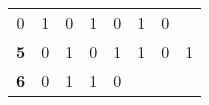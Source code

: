 \documentclass[11pt,english,landscape]{article}
\begin{document}
\begin{multicols}{3}
\begin{tabular}{| c | c | c | c | c | c | c | c |}
		\textcolor{MaterialIndigo}{0}          &                                                                                                
		\textcolor{MaterialPink}{1}            &                                                                                                
		\textcolor{MaterialIndigo}{0}          &                                                                                                
		\textcolor{MaterialPink}{1}            &                                                                                                
		\textcolor{MaterialIndigo}{0}          &                                                                                                
		\textcolor{MaterialPink}{1}            &                                                                                                
		\textcolor{MaterialIndigo}{0} 
		\\
		\rowcolor{GoogleYellow!20}\bfseries{5} &                                                                                                
		\textcolor{MaterialIndigo}{0}          &                                                                                                
		\textcolor{MaterialPink}{1}            &                                                                                                
		\textcolor{MaterialIndigo}{0}          &                                                                                                
		\textcolor{MaterialPink}{1}            &                                                                                                
		\textcolor{MaterialPink}{1}            &                                                                                                
		\textcolor{MaterialIndigo}{0}          &                                                                                                
		\textcolor{MaterialPink}{1} 
		\\
		\rowcolor{GoogleYellow!10}\bfseries{6} &                                                                                                
		\textcolor{MaterialIndigo}{0}          &                                                                                                
		\textcolor{MaterialPink}{1}            &                                                                                                
		\textcolor{MaterialPink}{1}            &                                                                                                
		\textcolor{MaterialIndigo}{0}          &                                                                                                

\end{tabular}
\end{multicols}
\end{document}
